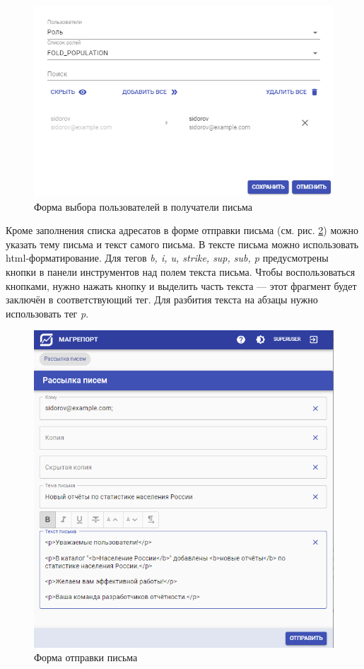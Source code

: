 \documentclass[../user-manual.tex]{subfiles}
\begin{document}
	\begin{figure}[h]
		\centering
		\includegraphics[width=\graphicswidth]{img/26-send-mail-select-users.png}
		\caption{Форма выбора пользователей в получатели письма}
		\label{fig:send-mail-select-users}
	\end{figure}

	Кроме заполнения списка адресатов в форме отправки письма (см. рис. \ref{fig:send-mail-form}) можно	указать тему письма и текст самого письма. В тексте письма можно использовать html-форматирование. Для тегов \textit{b, i, u, strike, sup, sub, p} предусмотрены кнопки в панели инструментов над полем текста письма. Чтобы воспользоваться кнопками, нужно нажать кнопку и выделить часть текста --- этот фрагмент будет заключён в соответствующий тег. Для разбития текста на абзацы нужно использовать тег \textit{p}.

	\begin{figure}[h]
		\centering
		\includegraphics[width=\graphicswidth]{img/27-send-mail-form.png}
		\caption{Форма отправки письма}
		\label{fig:send-mail-form}
	\end{figure}
\end{document}
